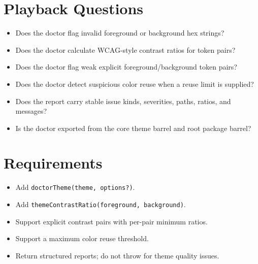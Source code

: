 \section{Playback Questions}\label{record-176-playback-questions}

\begin{itemize}
\tightlist
\item
  Does the doctor flag invalid foreground or background hex strings?
\item
  Does the doctor calculate WCAG-style contrast ratios for token pairs?
\item
  Does the doctor flag weak explicit foreground/background token pairs?
\item
  Does the doctor detect suspicious color reuse when a reuse limit is supplied?
\item
  Does the report carry stable issue kinds, severities, paths, ratios, and messages?
\item
  Is the doctor exported from the core theme barrel and root package barrel?
\end{itemize}

\section{Requirements}\label{record-176-requirements}

\begin{itemize}
\tightlist
\item
  Add \texttt{d\allowbreak{}o\allowbreak{}c\allowbreak{}t\allowbreak{}o\allowbreak{}r\allowbreak{}T\allowbreak{}h\allowbreak{}e\allowbreak{}m\allowbreak{}e\allowbreak{}(\allowbreak{}t\allowbreak{}h\allowbreak{}e\allowbreak{}m\allowbreak{}e\allowbreak{},\allowbreak{} \allowbreak{}o\allowbreak{}p\allowbreak{}t\allowbreak{}i\allowbreak{}o\allowbreak{}n\allowbreak{}s\allowbreak{}?\allowbreak{})}.
\item
  Add \texttt{t\allowbreak{}h\allowbreak{}e\allowbreak{}m\allowbreak{}e\allowbreak{}C\allowbreak{}o\allowbreak{}n\allowbreak{}t\allowbreak{}r\allowbreak{}a\allowbreak{}s\allowbreak{}t\allowbreak{}R\allowbreak{}a\allowbreak{}t\allowbreak{}i\allowbreak{}o\allowbreak{}(\allowbreak{}f\allowbreak{}o\allowbreak{}r\allowbreak{}e\allowbreak{}g\allowbreak{}r\allowbreak{}o\allowbreak{}u\allowbreak{}n\allowbreak{}d\allowbreak{},\allowbreak{} \allowbreak{}b\allowbreak{}a\allowbreak{}c\allowbreak{}k\allowbreak{}g\allowbreak{}r\allowbreak{}o\allowbreak{}u\allowbreak{}n\allowbreak{}d\allowbreak{})}.
\item
  Support explicit contrast pairs with per-pair minimum ratios.
\item
  Support a maximum color reuse threshold.
\item
  Return structured reports; do not throw for theme quality issues.
\end{itemize}

